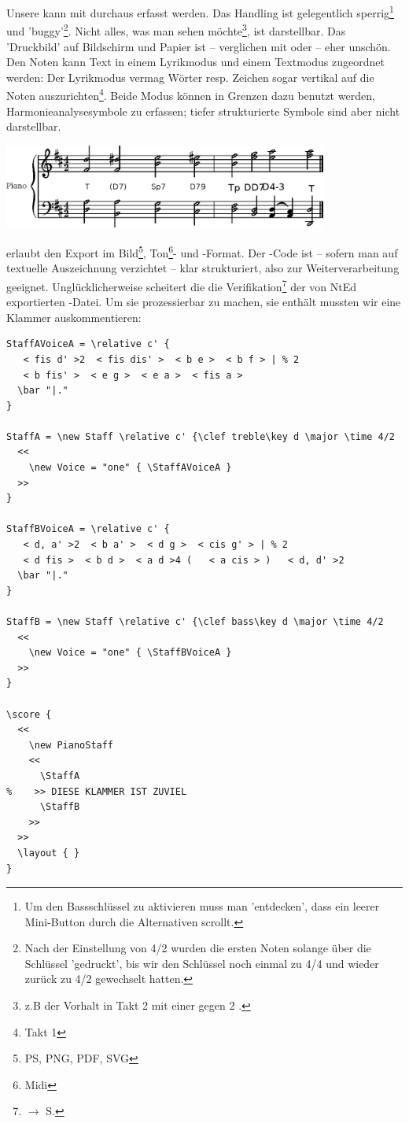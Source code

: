 Unsere  kann mit  durchaus erfasst werden. Das
Handling ist gelegentlich sperrig\footnote{Um den Bassschlüssel zu aktivieren
muss man 'entdecken', dass ein leerer Mini-Button durch die Alternativen
scrollt.} und 'buggy'\footnote{Nach der Einstellung von 4/2 wurden die ersten
Noten solange über die Schlüssel 'gedruckt', bis wir den Schlüssel noch einmal
zu 4/4 und wieder zurück zu 4/2 gewechselt hatten.}. Nicht alles, was man sehen
möchte\footnote{z.B der Vorhalt in Takt 2 mit einer \Halb gegen 2 \Vier.}, ist
darstellbar. Das 'Druckbild' auf Bildschirm und Papier ist -- verglichen mit
 oder  -- eher unschön. Den Noten kann Text in
einem Lyrikmodus und einem Textmodus zugeordnet werden: Der Lyrikmodus vermag
Wörter resp. Zeichen sogar vertikal auf die Noten auszurichten\footnote{Takt 1}.
Beide Modus können in Grenzen dazu benutzt werden, Harmonieanalysesymbole zu
erfassen; tiefer strukturierte Symbole sind aber nicht darstellbar.

\begin{center}
\includegraphics[width=0.8\textwidth]{frontends/nted/candenca2-ntd}
\end{center}

 erlaubt den Export im Bild\footnote{PS, PNG, PDF, SVG},
Ton\footnote{Midi}- und -Format. Der -Code ist --
sofern man auf textuelle Auszeichnung verzichtet -- klar strukturiert, also zur
Weiterverarbeitung geeignet. Unglücklicherweise scheitert die die
Verifikation\footnote{$\rightarrow$ S.\pageref{ExportVerifikation}} der von NtEd
exportierten -Datei. Um sie prozessierbar zu machen, sie enthält
mussten wir eine Klammer auskommentieren:

\begin{verbatim}
StaffAVoiceA = \relative c' {
   < fis d' >2  < fis dis' >  < b e >  < b f > | % 2
   < b fis' >  < e g >  < e a >  < fis a > 
  \bar "|."
}

StaffA = \new Staff \relative c' {\clef treble\key d \major \time 4/2
  <<
    \new Voice = "one" { \StaffAVoiceA } 
  >>
}

StaffBVoiceA = \relative c' {
   < d, a' >2  < b a' >  < d g >  < cis g' > | % 2
   < d fis >  < b d >  < a d >4 (   < a cis > )   < d, d' >2 
  \bar "|."
}

StaffB = \new Staff \relative c' {\clef bass\key d \major \time 4/2
  <<
    \new Voice = "one" { \StaffBVoiceA } 
  >>
}

\score {
  <<
    \new PianoStaff 
    <<
      \StaffA
%    >> DIESE KLAMMER IST ZUVIEL
      \StaffB
    >>
  >>
  \layout { }
}
\end{verbatim}

